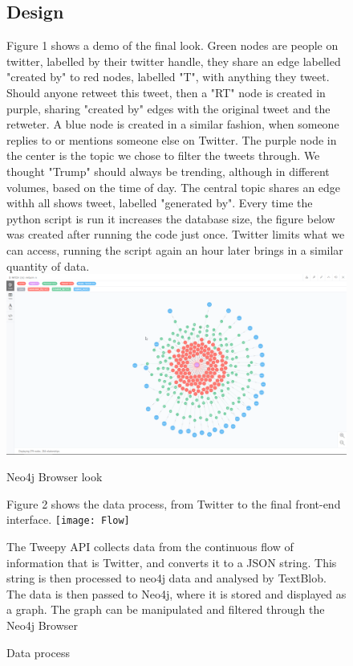 \documentclass[11pt]{article}
\begin{document}
\begin{figure}
\subsection{Design}
Figure 1 shows a demo of the final look.\newline
 Green nodes are people on twitter, labelled by their twitter handle, they share an edge labelled "created by" to red nodes, labelled "T", with anything they tweet. Should anyone retweet this tweet, then a "RT" node is created in purple, sharing "created by" edges with the original tweet and the retweter. A blue node is created in a similar fashion, when someone replies to or mentions someone else on Twitter.\newline
 The purple node in the center is the topic we chose to filter the tweets through. We thought "Trump" should always be trending, although in different volumes, based on the time of day. The central topic shares an edge withh all shows tweet, labelled "generated by". \newline
Every time the python script is run it increases the database size, the figure below was created after running the code just once. Twitter limits what we can access, running the script again an hour later brings in a similar quantity of data. 
\includegraphics[width=\textwidth]{Neo2}
\caption{Neo4j Browser look} 
\label{fig: 1}
\end{figure}

\begin{figure}
Figure 2 shows the data process, from Twitter to the final front-end interface.\newline
\newline
\texttt{[image: Flow]}\newline
\caption{Data process} 
\label{fig: 2}
The Tweepy API collects data from the continuous flow of information that is Twitter, and converts it to a JSON string. This string is then processed to neo4j data and analysed by TextBlob. The data is then passed to Neo4j, where it is stored and displayed as a graph. The graph can be manipulated and filtered through the Neo4j Browser
\end{figure}
\end{document}
